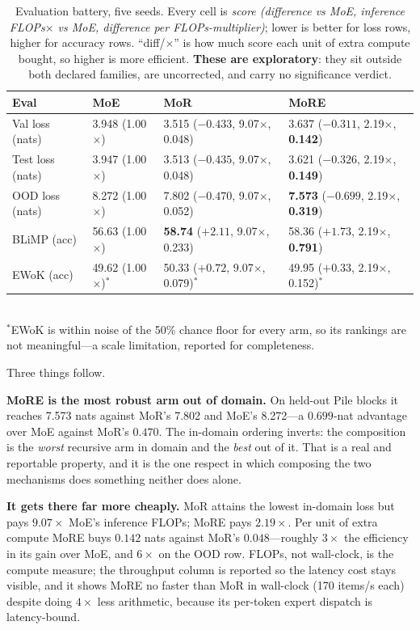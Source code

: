 \begin{table}[t]
\centering
\small
\caption{Evaluation battery, five seeds. Every cell is
\emph{score (difference vs MoE, inference FLOPs$\times$ vs MoE, difference per
FLOPs-multiplier)}; lower is better for loss rows, higher for accuracy rows.
``diff/$\times$'' is how much score each unit of extra compute bought, so higher is
more efficient. \textbf{These are exploratory}: they sit outside both declared
families, are uncorrected, and carry no significance verdict.}
\label{tab:evals}
\vspace{2pt}
\begin{tabular}{llll}
\toprule
Eval & MoE & MoR & MoRE \\
\midrule
Val loss (nats) & 3.948 (1.00$\times$) & 3.515 ($-0.433$, 9.07$\times$, 0.048) & 3.637 ($-0.311$, 2.19$\times$, \textbf{0.142}) \\
Test loss (nats) & 3.947 (1.00$\times$) & 3.513 ($-0.435$, 9.07$\times$, 0.048) & 3.621 ($-0.326$, 2.19$\times$, \textbf{0.149}) \\
OOD loss (nats) & 8.272 (1.00$\times$) & 7.802 ($-0.470$, 9.07$\times$, 0.052) & \textbf{7.573} ($-0.699$, 2.19$\times$, \textbf{0.319}) \\
BLiMP (acc) & 56.63 (1.00$\times$) & \textbf{58.74} ($+2.11$, 9.07$\times$, 0.233) & 58.36 ($+1.73$, 2.19$\times$, \textbf{0.791}) \\
EWoK (acc) & 49.62 (1.00$\times$)$^{*}$ & 50.33 ($+0.72$, 9.07$\times$, 0.079)$^{*}$ & 49.95 ($+0.33$, 2.19$\times$, 0.152)$^{*}$ \\
\bottomrule
\end{tabular}
\\[3pt]
{\footnotesize $^{*}$EWoK is within noise of the 50\% chance floor for every arm,
so its rankings are not meaningful---a scale limitation, reported for completeness.}
\end{table}

Three things follow.

\textbf{MoRE is the most robust arm out of domain.} On held-out Pile blocks
\citep{gao2020pile} it reaches 7.573 nats against MoR's 7.802 and MoE's 8.272---a
$0.699$-nat advantage over MoE against MoR's $0.470$. The in-domain ordering
inverts: the composition is the \emph{worst} recursive arm in domain and the
\emph{best} out of it. That is a real and reportable property, and it is the one
respect in which composing the two mechanisms does something neither does alone.

\textbf{It gets there far more cheaply.} MoR attains the lowest in-domain loss but
pays $9.07\times$ MoE's inference FLOPs; MoRE pays $2.19\times$. Per unit of extra
compute MoRE buys $0.142$ nats against MoR's $0.048$---roughly $3\times$ the
efficiency in its gain over MoE, and $6\times$ on the OOD row. FLOPs, not
wall-clock, is the compute measure; the throughput column is reported so the
latency cost stays visible, and it shows MoRE no faster than MoR in wall-clock
(170 items/s each) despite doing $4\times$ less arithmetic, because its per-token
expert dispatch is latency-bound.

